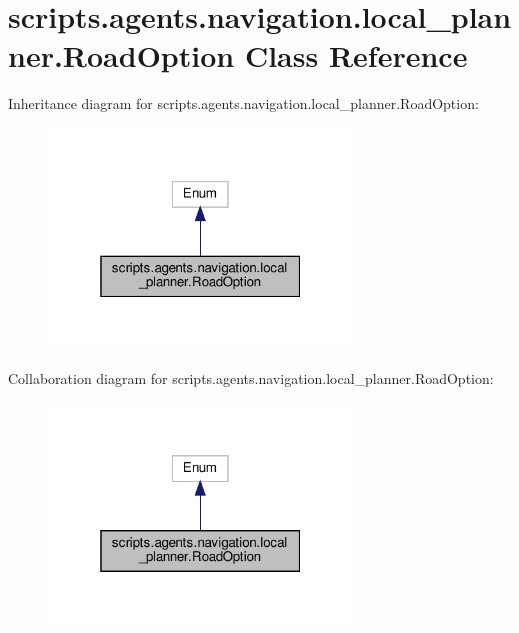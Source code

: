 \hypertarget{classscripts_1_1agents_1_1navigation_1_1local__planner_1_1RoadOption}{}\section{scripts.\+agents.\+navigation.\+local\+\_\+planner.\+Road\+Option Class Reference}
\label{classscripts_1_1agents_1_1navigation_1_1local__planner_1_1RoadOption}


Inheritance diagram for scripts.\+agents.\+navigation.\+local\+\_\+planner.\+Road\+Option\+:\nopagebreak
\begin{figure}[H]
\begin{center}
\leavevmode
\includegraphics[width=229pt]{dd/df3/classscripts_1_1agents_1_1navigation_1_1local__planner_1_1RoadOption__inherit__graph}
\end{center}
\end{figure}


Collaboration diagram for scripts.\+agents.\+navigation.\+local\+\_\+planner.\+Road\+Option\+:\nopagebreak
\begin{figure}[H]
\begin{center}
\leavevmode
\includegraphics[width=229pt]{d0/dfb/classscripts_1_1agents_1_1navigation_1_1local__planner_1_1RoadOption__coll__graph}
\end{center}
\end{figure}
